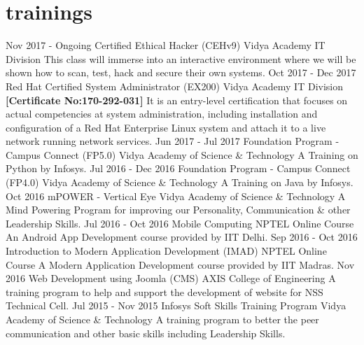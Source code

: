 \documentclass[]{friggeri-cv}
\begin{document}
\section{trainings}
\begin{entrylist}
	\entry
	{Nov 2017 - Ongoing}
	{Certified Ethical Hacker (CEHv9)}
	{Vidya Academy IT Division}
	{This class will immerse into an interactive environment where we will be shown how to scan, test, hack and secure their own systems.}
	\entry
	{Oct 2017 - Dec 2017}
	{Red Hat Certified System Administrator (EX200)}
	{Vidya Academy IT Division \newline \textbf{[Certificate No:170-292-031]}}
	{It is an entry-level certification that focuses on actual competencies at system administration, including installation and configuration of a Red Hat Enterprise Linux system and attach it to a live network running network services.}
	\entry
	{Jun 2017 - Jul 2017}
	{Foundation Program - Campus Connect (FP5.0)}
	{Vidya Academy of Science \& Technology}
	{A Training on Python by Infosys.}
	\entry
	{Jul 2016 - Dec 2016}
	{Foundation Program - Campus Connect (FP4.0)}
	{Vidya Academy of Science \& Technology}
	{A Training on Java by Infosys.}
	\entry
	{Oct 2016}
	{mPOWER - Vertical Eye}
	{Vidya Academy of Science \& Technology}
	{A Mind Powering Program for improving our Personality, Communication \& other Leadership Skills.}
    \entry
	{Jul 2016 - Oct 2016}
	{Mobile Computing}
	{NPTEL Online Course}
	{An Android App Development course provided by IIT Delhi.}
    \entry
	{Sep 2016 - Oct 2016}
	{Introduction to Modern Application Development (IMAD)}
	{NPTEL Online Course}
	{A Modern Application Development course provided by IIT Madras.}
    \entry
	{Nov 2016}
	{Web Development using Joomla (CMS)}
	{AXIS College of Engineering}
	{A training program to help and support the development of website for NSS Technical Cell.}
    \entry
	{Jul 2015 - Nov 2015}
	{Infosys Soft Skills Training Program}
	{Vidya Academy of Science \& Technology}
	{A training program to better the peer communication and other basic skills including Leadership Skills.}
\end{entrylist}
\ 
\end{document}
